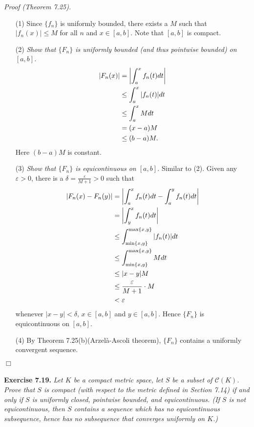 \documentclass{article}
\begin{document}
\emph{Proof (Theorem 7.25).}
\begin{enumerate}
\item[(1)]
  Since $\{f_n\}$ is uniformly bounded,
  there exists a $M$ such that $|f_n(x)| \leq M$ for all $n$ and $x \in [a,b]$.
  Note that $[a,b]$ is compact.

\item[(2)]
  \emph{Show that $\{F_n\}$ is uniformly bounded
  (and thus pointwise bounded) on $[a,b]$.}
  \begin{align*}
    \abs{F_n(x)}
    &= \abs{ \int_{a}^{x} f_n(t)dt } \\
    &\leq \int_{a}^{x} \abs{f_n(t)}dt \\
    &\leq \int_{a}^{x} M dt \\
    &= (x-a)M \\
    &\leq (b-a)M.
  \end{align*}
  Here $(b-a)M$ is constant.

\item[(3)]
  \emph{Show that $\{F_n\}$ is equicontinuous on $[a,b]$.}
  Similar to (2).
  Given any $\varepsilon > 0$,
  there is a $\delta = \frac{\varepsilon}{M+1} > 0$ such that
  \begin{align*}
    \abs{F_n(x)-F_n(y)}
    &= \abs{ \int_{a}^{x} f_n(t)dt - \int_{a}^{y} f_n(t)dt } \\
    &= \abs{ \int_{y}^{x} f_n(t)dt } \\
    &\leq \int_{\min\{x,y\}}^{\max\{x,y\}} \abs{f_n(t)}dt \\
    &\leq \int_{\min\{x,y\}}^{\max\{x,y\}} M dt \\
    &\leq |x-y|M \\
    &\leq \frac{\varepsilon}{M+1} \cdot M \\
    &< \varepsilon
  \end{align*}
  whenever $|x-y| < \delta$, $x \in [a,b]$ and $y \in [a,b]$.
  Hence $\{F_n\}$ is equicontinuous on $[a,b]$.

\item[(4)]
  By Theorem 7.25(b)(Arzel\`{a}-Ascoli theorem),
  $\{F_n\}$ contains a uniformly convergent sequence.
\end{enumerate}
$\Box$ \\\\






\textbf{Exercise 7.19.}
\emph{Let $K$ be a compact metric space,
let $S$ be a subset of $\mathscr{C}(K)$.
Prove that $S$ is compact (with respect to the metric defined in Section 7.14)
if and only if
$S$ is uniformly closed, pointwise bounded, and equicontinuous.
(If $S$ is not equicontinuous,
then $S$ contains a sequence which has no equicontinuous subsequence,
hence has no subsequence that converges uniformly on $K$.)} \\
\end{document}
